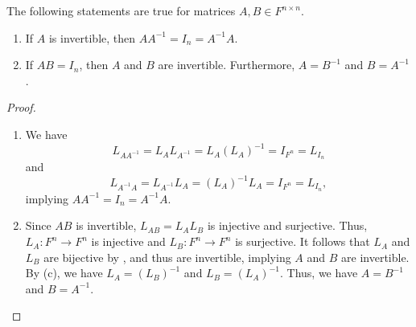 \begin{proposition}
  \label{prop:invertible-matrix}
  The following statements are true for matrices $A, B \in F^{n \times n}$.
  \begin{enumerate}
    \item If $A$ is invertible, then $AA^{-1} = I_n = A^{-1}A$.
    \item If $AB = I_n$, then $A$ and $B$ are invertible.
    Furthermore, $A = B^{-1}$ and $B = A^{-1}$.
  \end{enumerate}
\end{proposition}
\begin{proof}
  \leavevmode
  \begin{enumerate}
    \item We have
    \begin{equation*}
      L_{AA^{-1}} = L_AL_{A^{-1}} = L_A(L_A)^{-1} = I_{F^n} = L_{I_n}
    \end{equation*}
    and
    \begin{equation*}
      L_{A^{-1}A} = L_{A^{-1}}L_A = (L_A)^{-1}L_A = I_{F^n} = L_{I_n},
    \end{equation*}
    implying $AA^{-1} = I_n = A^{-1}A$.
    
    \item Since $AB$ is invertible, $L_{AB} = L_AL_B$ is injective and
    surjective.
    Thus, ${L_A: F^n \to F^n}$ is injective and ${L_B: F^n \to F^n}$ is
    surjective.
    It follows that $L_A$ and $L_B$ are bijective by ,
    and thus are invertible, implying $A$ and $B$ are invertible.
    By  (c), we have $L_A = (L_B)^{-1}$ and
    $L_B = (L_A)^{-1}$.
    Thus, we have $A = B^{-1}$ and $B = A^{-1}$.
    \qedhere
  \end{enumerate}
\end{proof}
